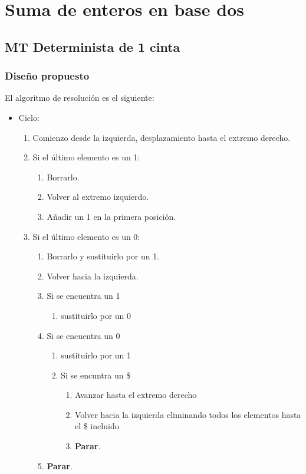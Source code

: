 \section{Suma de enteros en base dos}


\subsection{MT Determinista de 1 cinta}

\subsubsection*{Diseño propuesto}
El algoritmo de resolución es el siguiente:

\begin{itemize}
    \item Ciclo:
    \begin{enumerate}
        \item Comienzo desde la izquierda, desplazamiento hasta el extremo derecho.
        \item Si el último elemento es un 1:
        \begin{enumerate}
            \item Borrarlo.
            \item Volver al extremo izquierdo.
            \item Añadir un 1 en la primera posición.
        \end{enumerate}
        \item Si el último elemento es un 0:
        \begin{enumerate}
            \item Borrarlo y sustituirlo por un 1.
            \item Volver hacia la izquierda.
            \item Si se encuentra un 1 
            \begin{enumerate}
                \item sustituirlo por un 0
            \end{enumerate}
            \item Si se encuentra un 0
            \begin{enumerate}
                \item sustituirlo por un 1
                \item Si se encuntra un \$
                \begin{enumerate}
                    \item Avanzar hasta el extremo derecho
                    \item Volver hacia la izquierda eliminando todos los elementos hasta el \$ incluido
                    \item \textbf{Parar}.
                \end{enumerate}
            \end{enumerate}
            \item \textbf{Parar}.
        \end{enumerate}
    \end{enumerate}
\end{itemize}

